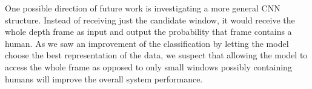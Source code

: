     One possible direction of future work is investigating a more general CNN structure. Instead of receiving just the candidate window, it would receive the whole depth frame as input and output the probability that frame contains a human. As we saw an improvement of the classification by letting the model choose the best representation of the data, we suspect that allowing the model to access the whole frame as opposed to only small windows possibly containing humans will improve the overall system performance.
